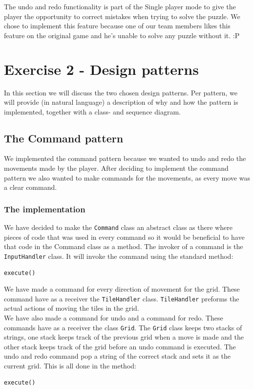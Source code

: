 \documentclass[a4paper,11pt,report]{scrartcl}
\begin{document}
The undo and redo functionality is part of the Single player mode to give the player the opportunity to correct mistakes when trying to solve the puzzle. We chose to implement this feature because one of our team members likes this feature on the original game and he's unable to solve any puzzle without it. :P

\newpage\section{Exercise 2 - Design patterns}
In this section we will discuss the two chosen design patterns. Per pattern,
we will provide (in natural language) a description of why and how the pattern
is implemented, together with a class- and sequence diagram.

\subsection{The Command pattern}
We implemented the command pattern because we wanted to undo and redo the movements made by the player. After deciding to implement the command pattern we also wanted to make commands for the movements, as every move was a clear command.

\subsubsection{The implementation}
We have decided to make the \texttt{Command} class an abstract class as there where pieces of code that was used in every command so it would be beneficial to have that code in the Command class as a method.  The invoker of a command is the \texttt{InputHandler} class. It will invoke the command using the standard method: 
\begin{verbatim}
execute()
\end{verbatim}
We have made a command for every direction of movement for the grid. These command have as a receiver the \texttt{TileHandler} class. \texttt{TileHandler} preforms the actual actions of moving the tiles in the grid.\\

We have also made a command for undo and a command for redo. These commands have as a receiver the class \texttt{Grid}. The \texttt{Grid} class keeps two stacks of strings, one stack keeps track of the previous grid when a move is made and the other stack keeps track of the grid before an undo command is executed. The undo and redo command pop a string of the correct stack and sets it as the current grid. This is all done in the method:
\begin{verbatim}
execute()
\end{verbatim}
\end{document}
